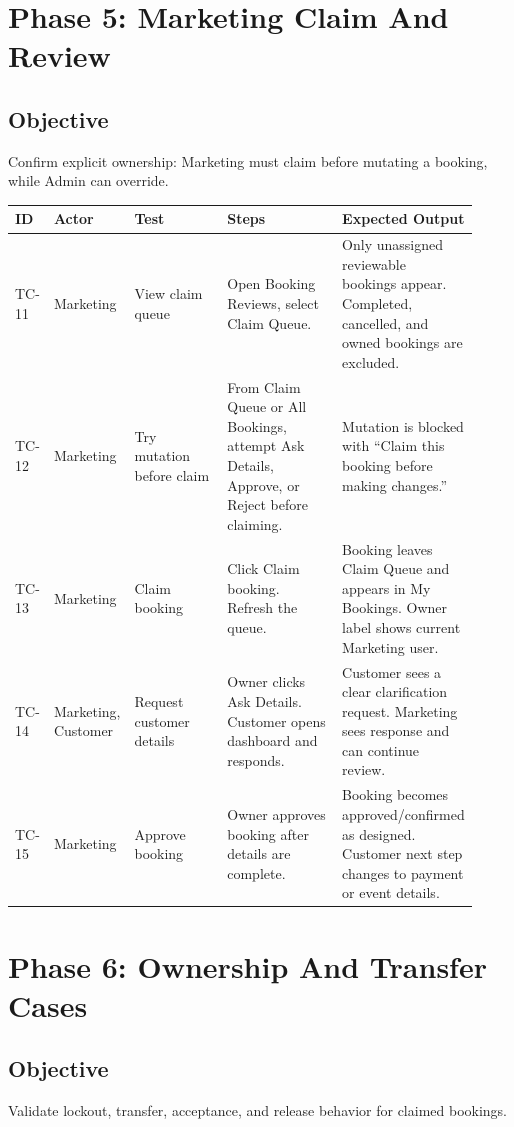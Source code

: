 \documentclass[11pt,a4paper]{article}
\begin{document}
\section{Phase 5: Marketing Claim And Review}
\subsection{Objective}
Confirm explicit ownership: Marketing must claim before mutating a booking, while Admin can override.

\begin{longtable}{p{0.07\linewidth}p{0.13\linewidth}p{0.22\linewidth}p{0.28\linewidth}p{0.22\linewidth}}
\toprule
\textbf{ID} & \textbf{Actor} & \textbf{Test} & \textbf{Steps} & \textbf{Expected Output} \\
\midrule
TC-11 & Marketing & View claim queue & Open Booking Reviews, select Claim Queue. & Only unassigned reviewable bookings appear. Completed, cancelled, and owned bookings are excluded. \\
TC-12 & Marketing & Try mutation before claim & From Claim Queue or All Bookings, attempt Ask Details, Approve, or Reject before claiming. & Mutation is blocked with ``Claim this booking before making changes.'' \\
TC-13 & Marketing & Claim booking & Click Claim booking. Refresh the queue. & Booking leaves Claim Queue and appears in My Bookings. Owner label shows current Marketing user. \\
TC-14 & Marketing, Customer & Request customer details & Owner clicks Ask Details. Customer opens dashboard and responds. & Customer sees a clear clarification request. Marketing sees response and can continue review. \\
TC-15 & Marketing & Approve booking & Owner approves booking after details are complete. & Booking becomes approved/confirmed as designed. Customer next step changes to payment or event details. \\
\bottomrule
\end{longtable}

\section{Phase 6: Ownership And Transfer Cases}
\subsection{Objective}
Validate lockout, transfer, acceptance, and release behavior for claimed bookings.
\end{document}
